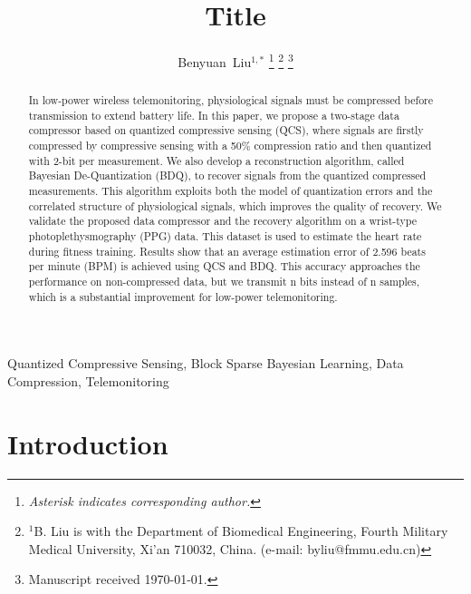 \documentclass[twocolumn,letterpaper,10pt]{IEEEtran}
\begin{document}
\title{Title}
\author{%
Benyuan~Liu$^{1,*}$%
\thanks{\textit{Asterisk indicates corresponding author.}}%
\thanks{$^1$B. Liu is with the Department of Biomedical Engineering,
Fourth Military Medical University, Xi'an 710032, China. (e-mail: byliu@fmmu.edu.cn)}
\thanks{Manuscript received \today{}.}%
}


\maketitle


\begin{abstract}
\boldmath
In low-power wireless telemonitoring,
physiological signals must be compressed before transmission to extend battery life.
In this paper, we propose a two-stage data compressor based on quantized compressive sensing (QCS),
where signals are firstly compressed by compressive sensing with a 50\% compression ratio
and then quantized with 2-bit per measurement.
We also develop a reconstruction algorithm, called Bayesian De-Quantization (BDQ),
to recover signals from the quantized compressed measurements.
This algorithm exploits both the model of quantization errors and
the correlated structure of physiological signals, which improves the quality of recovery.
We validate the proposed data compressor and the recovery algorithm on a wrist-type photoplethysmography (PPG) data.
This dataset is used to estimate the heart rate during fitness training.
Results show that an average estimation error of 2.596 beats per minute (BPM) is achieved using QCS and BDQ.
This accuracy approaches the performance on non-compressed data,
but we transmit n bits instead of n samples, which is a substantial improvement for low-power telemonitoring.
\end{abstract}
\begin{IEEEkeywords}
    Quantized Compressive Sensing, Block Sparse Bayesian Learning, Data Compression, Telemonitoring
\end{IEEEkeywords}


\section{Introduction}
\end{document}
